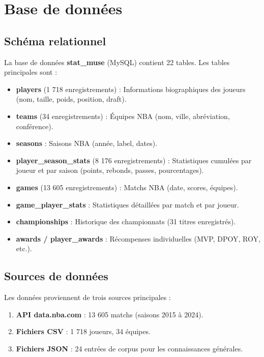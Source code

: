 \documentclass[12pt,a4paper]{report}
\begin{document}
\section{Base de données}

\subsection{Schéma relationnel}

La base de données \textbf{stat\_muse} (MySQL) contient 22 tables. Les tables principales sont :

\begin{itemize}
    \item \textbf{players} (1 718 enregistrements) : Informations biographiques des joueurs (nom, taille, poids, position, draft).
    \item \textbf{teams} (34 enregistrements) : Équipes NBA (nom, ville, abréviation, conférence).
    \item \textbf{seasons} : Saisons NBA (année, label, dates).
    \item \textbf{player\_season\_stats} (8 176 enregistrements) : Statistiques cumulées par joueur et par saison (points, rebonds, passes, pourcentages).
    \item \textbf{games} (13 605 enregistrements) : Matchs NBA (date, scores, équipes).
    \item \textbf{game\_player\_stats} : Statistiques détaillées par match et par joueur.
    \item \textbf{championships} : Historique des championnats (31 titres enregistrés).
    \item \textbf{awards / player\_awards} : Récompenses individuelles (MVP, DPOY, ROY, etc.).
\end{itemize}

\subsection{Sources de données}

Les données proviennent de trois sources principales :
\begin{enumerate}
    \item \textbf{API data.nba.com} : 13 605 matchs (saisons 2015 à 2024).
    \item \textbf{Fichiers CSV} : 1 718 joueurs, 34 équipes.
    \item \textbf{Fichiers JSON} : 24 entrées de corpus pour les connaissances générales.
\end{enumerate}
\end{document}
